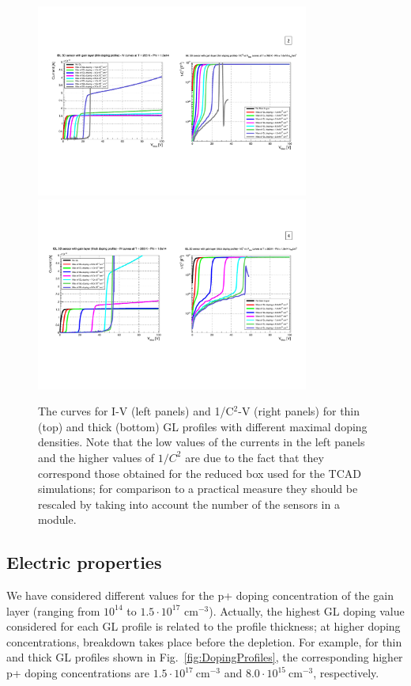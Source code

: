 \documentclass[aps,pt14,superscriptaddress,floatfix,nofootinbib]{revtex4}
\begin{document}
\begin{figure}[h!]
\begin{center}
\includegraphics[width=0.80\textwidth,keepaspectratio]{figures1/Thin_IV_CV_curves.pdf}
\includegraphics[width=0.80\textwidth,keepaspectratio]{figures1/Thick_IV_CV_curves.pdf}
\end{center}
\caption{The curves for I-V (left panels) and 1/C$^2$-V (right panels) for  thin (top) and thick (bottom) GL profiles  with different maximal doping densities. Note that the low values of the currents in the left panels and the higher values of $1/C^2$ are due to the fact that they correspond those obtained for the reduced box used for the TCAD simulations; for comparison to a practical measure they should be rescaled by taking into account the number of the sensors in a module.
\label{fig:IV-CV}}
\end{figure}

\subsection{Electric properties}    
We have considered different values for the p+ doping concentration of the gain layer (ranging from $10^{14}$ to $1.5\cdot 10^{17}$ cm$^{-3}$). Actually, the highest GL doping value considered for each GL profile is related to the profile thickness; at higher doping concentrations, breakdown takes place before the depletion. For example, for thin and thick GL profiles shown in Fig.~\ref{fig:DopingProfiles}, the corresponding higher p+ doping  concentrations are $1.5\cdot 10^{17}\ \mathrm{cm^{-3}}$ and $8.0\cdot 10^{15}\ \mathrm{cm^{-3}}$, respectively. 
\end{document}
